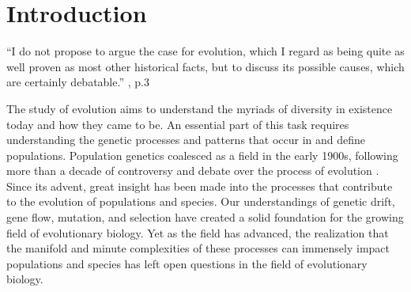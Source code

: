 \chapter{Introduction}
\label{chap:introduction}

\begin{quoteshrink}
  ``I do not propose to argue the case for evolution, which I regard as being quite as well proven as most other historical facts, but to discuss its possible causes, which are certainly debatable.''
  \hfill\citet{Haldane:1932}, p.3
\end{quoteshrink}

\noindent



The study of evolution aims to understand the myriads of diversity in existence today and how they came to be. An essential part of this task requires understanding the genetic processes and patterns that occur in and define populations. Population genetics coalesced as a field in the early 1900s, following more than a decade of controversy and debate over the process of evolution \citep{Provine:2001}. Since its advent, great insight has been made into the processes that contribute to the evolution of populations and species. Our understandings of genetic drift, gene flow, mutation, and selection have created a solid foundation for the growing field of evolutionary biology. Yet as the field has advanced, the realization that the manifold and minute complexities of these processes can immensely impact populations and species has left open questions in the field of evolutionary biology.

